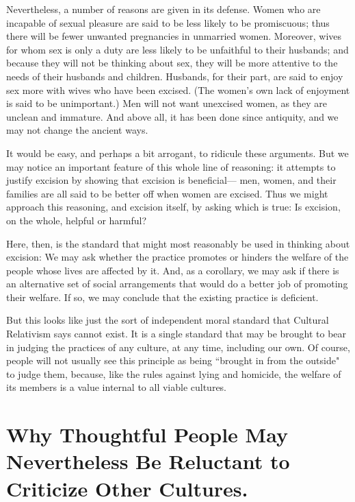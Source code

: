 Nevertheless, a number of reasons are given in its defense. Women who 
are incapable of sexual pleasure are said to be less likely  to be 
promiscuous; thus there will be fewer unwanted pregnancies in 
unmarried women. Moreover, wives for whom sex is only a duty are less 
likely  to  be  unfaithful  to  their  husbands;  and  because  they  will  not  be 
thinking  about  sex,  they  will  be  more  attentive  to  the  needs  of  their 
husbands  and  children.  Husbands,  for  their  part,  are  said  to  enjoy  sex 
more  with  wives  who  have  been  excised.  (The  women's  own  lack  of 
enjoyment  is  said  to  be  unimportant.)  Men  will  not  want  unexcised 
women,  as  they  are  unclean  and  immature.  And  above  all,  it  has  been 
done since antiquity, and we may not change the ancient ways. 

It would be easy, and perhaps a bit arrogant, to ridicule these 
arguments. But we may notice an important feature of this whole line of 
reasoning:  it  attempts  to  justify  excision  by  showing  that  excision  is 
beneficial— men,  women,  and their  families  are  all  said  to be  better  off 
when women are excised. Thus we might approach this reasoning, and 
excision itself, by asking which is true: Is excision, on the whole, helpful 
or harmful? 

Here,  then,  is  the  standard  that  might  most  reasonably  be  used  in 
thinking  about  excision:  We  may  ask  whether  the  practice  promotes  or 
hinders the welfare of the people whose lives are affected by it. And, as 
a corollary, we may ask if there is an alternative set of social 
arrangements that would do a better job of promoting their welfare. If so, 
we may conclude that the existing practice is deficient. 

But  this  looks  like  just  the  sort  of  independent  moral  standard  that 
Cultural Relativism says cannot exist. It is a single standard that may be 
brought  to  bear  in  judging  the practices  of  any  culture,  at  any  time, 
including our own. Of course, people will not usually see this principle as 
being ``brought in from the outside" to judge them, because, like the rules 
against lying and homicide, the welfare of its members is a value internal 
to all viable cultures. 

\section{Why Thoughtful People  May Nevertheless  Be Reluctant to Criticize 
Other Cultures.}

